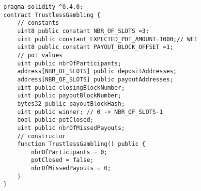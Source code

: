 \begin{lstlisting}[basicstyle=\small]
pragma solidity ^0.4.0;
contract TrustlessGambling {
    // constants
    uint8 public constant NBR_OF_SLOTS =3;
    uint public constant EXPECTED_POT_AMOUNT=1000;// WEI
    uint8 public constant PAYOUT_BLOCK_OFFSET =1;    
    // pot values
    uint public nbrOfParticipants;
    address[NBR_OF_SLOTS] public depositAddresses;
    address[NBR_OF_SLOTS] public payoutAddresses;
    uint public closingBlockNumber;
    uint public payoutBlockNumber;
    bytes32 public payoutBlockHash;
    uint public winner; // 0 -> NBR_OF_SLOTS-1
    bool public potClosed;
    uint public nbrOfMissedPayouts;
    // constructor
    function TrustlessGambling() public {
        nbrOfParticipants = 0;
        potClosed = false;
        nbrOfMissedPayouts = 0;
    }
}
\end{lstlisting}

